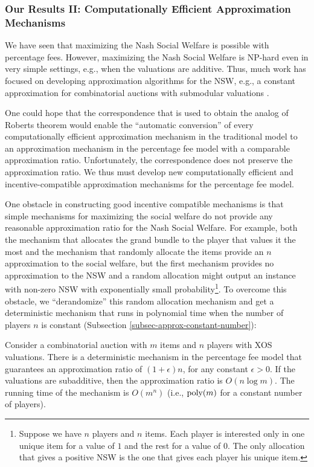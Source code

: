 \documentclass{article}
\newcommand{\poly}{\hbox{poly}}
\begin{document}
\subsubsection*{Our Results II: Computationally Efficient Approximation Mechanisms}

We have seen that maximizing the Nash Social Welfare is possible with percentage fees. However, maximizing the Nash Social Welfare is NP-hard even in very simple settings, e.g., when the valuations are additive. Thus, much work has focused on developing approximation algorithms for the NSW, e.g., a constant approximation for combinatorial auctions with submodular valuations \cite{LV22,GHLVV22}. 



One could hope that the correspondence that is used to obtain the analog of Roberts theorem would enable the ``automatic conversion'' of every computationally efficient approximation mechanism in the traditional model to an approximation mechanism in the percentage fee model with a comparable approximation ratio. Unfortunately, the correspondence does not preserve the approximation ratio. We thus must develop new computationally efficient and incentive-compatible approximation mechanisms for the percentage fee model.





One obstacle in constructing good incentive compatible mechanisms is that simple mechanisms for maximizing the social welfare do not provide any reasonable approximation ratio for the Nash Social Welfare. For example, both the mechanism that allocates the grand bundle to the player that values it the most and the mechanism that randomly allocate the items provide an $n$ approximation to the social welfare, but the first mechanism provides no approximation to the NSW and a random allocation might output an instance with non-zero NSW with exponentially small probability\footnote{Suppose we have $n$ players and $n$ items. Each player is interested only in one unique item for a value of $1$ and the rest for a value of $0$. The only allocation that gives a positive NSW is the one that gives each player his unique item.}. To overcome this obstacle, we ``derandomize'' this random allocation mechanism and get a deterministic mechanism that runs in polynomial time when the number of players $n$ is constant (Subsection \ref{subsec-approx-constant-number}):

\begin{theorem*}
Consider a combinatorial auction with $m$ items and $n$ players with XOS valuations. There is a deterministic mechanism in the percentage fee model that guarantees an approximation ratio of $(1+\epsilon) n$, for any constant $\epsilon>0$. If the valuations are subadditive, then the approximation ratio is $O(n \log m)$. The running time of the mechanism is $O(m^n)$ (i.e., $\poly(m)$ for a constant number of players).
\end{theorem*}
\end{document}
